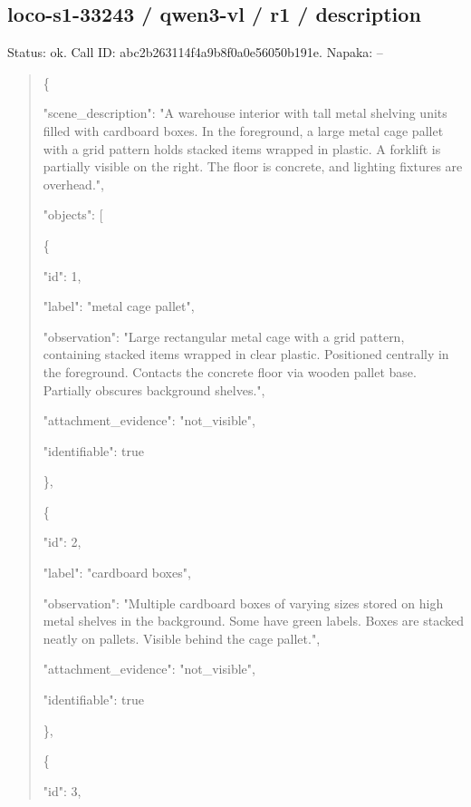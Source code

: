 \documentclass[10pt,a4paper]{article}
\begin{document}
\subsection*{loco-s1-33243 / qwen3-vl / r1 / description}
Status: ok. Call ID: abc2b263114f4a9b8f0a0e56050b191e. Napaka: --
\begin{quote}\footnotesize
\{\par
  "scene\_description":\allowbreak{} "A warehouse interior with tall metal shelving units filled with cardboard boxes. In the foreground,\allowbreak{} a large metal cage pallet with a grid pattern holds stacked items wrapped in plastic. A forklift is partially visible on the right. The floor is concrete,\allowbreak{} and lighting fixtures are overhead.",\allowbreak{}\par
  "objects":\allowbreak{} [\par
    \{\par
      "id":\allowbreak{} 1,\allowbreak{}\par
      "label":\allowbreak{} "metal cage pallet",\allowbreak{}\par
      "observation":\allowbreak{} "Large rectangular metal cage with a grid pattern,\allowbreak{} containing stacked items wrapped in clear plastic. Positioned centrally in the foreground. Contacts the concrete floor via wooden pallet base. Partially obscures background shelves.",\allowbreak{}\par
      "attachment\_evidence":\allowbreak{} "not\_visible",\allowbreak{}\par
      "identifiable":\allowbreak{} true\par
    \},\allowbreak{}\par
    \{\par
      "id":\allowbreak{} 2,\allowbreak{}\par
      "label":\allowbreak{} "cardboard boxes",\allowbreak{}\par
      "observation":\allowbreak{} "Multiple cardboard boxes of varying sizes stored on high metal shelves in the background. Some have green labels. Boxes are stacked neatly on pallets. Visible behind the cage pallet.",\allowbreak{}\par
      "attachment\_evidence":\allowbreak{} "not\_visible",\allowbreak{}\par
      "identifiable":\allowbreak{} true\par
    \},\allowbreak{}\par
    \{\par
      "id":\allowbreak{} 3,\allowbreak{}\par

\end{quote}
\end{document}
